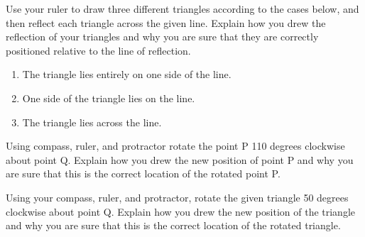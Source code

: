 \documentclass{ximera}
\begin{document}
\newpage
\begin{problem}
Use your ruler to draw three different triangles according to the cases below, and then reflect each triangle across the given line. Explain how you drew the reflection of your triangles and why you are sure that they are correctly positioned relative to the line of reflection.\\
\begin{enumerate}
    \item The triangle lies entirely on one side of the line.
    \item One side of the triangle lies on the line.
    \item The triangle lies across the line.
\end{enumerate}
\vskip 1in

\begin{center}
\end{center}


\vfill


\end{problem}
\newpage
\begin{problem}
Using compass, ruler, and protractor rotate the point P 110 degrees clockwise about point Q.  Explain how you drew the new position of point P and why you are sure that this is the correct location of the rotated point P.\\
\vfill

\begin{center}
\end{center}

\vfill
\end{problem}
\newpage

\begin{problem}
Using your compass, ruler, and protractor, rotate the given triangle 50 degrees clockwise about point Q.  Explain how you drew the new position of the triangle and why you are sure that this is the correct location of the rotated triangle.\\


\begin{center}
\end{center}
\vfill
\end{problem}
\newpage
\end{document}
